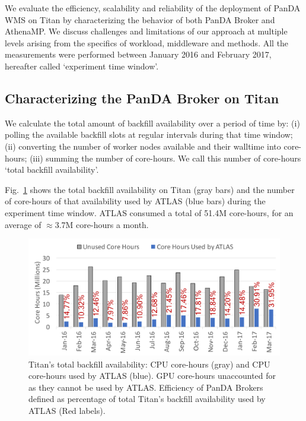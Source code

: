 We evaluate the efficiency, scalability and reliability of the deployment of
PanDA WMS on Titan by characterizing the behavior of both PanDA Broker and
AthenaMP\@. We discuss challenges and limitations of our approach at multiple
levels arising from the specifics of workload, middleware and methods. All
the measurements were performed between January 2016 and February 2017,
hereafter called `experiment time window'.

\subsection{Characterizing the PanDA Broker on Titan}
\label{ssec:broker_titan}

We calculate the total amount of backfill availability over a period of time
by: (i) polling the available backfill slots at regular intervals during that
time window; (ii) converting the number of worker nodes available and their
walltime into core-hours; (iii) summing the number of core-hours. We call
this number of core-hours `total backfill availability'.

Fig.~\ref{fig:backfill-utilization} shows the total backfill availability on
Titan (gray bars) and the number of core-hours of that availability used by
ATLAS (blue bars) during the experiment time window. ATLAS consumed a total
of 51.4M core-hours, for an average of $\approx$3.7M core-hours a month. 

\begin{figure}[!t]
    \includegraphics[clip,width=\columnwidth]{figures/backfill_consumption.pdf}
    \vspace{-0.3in}
    \caption{Titan's total backfill availability: CPU core-hours (gray) and
    CPU core-hours used by ATLAS (blue). GPU core-hours unaccounted for as
    they cannot be used by ATLAS\@. Efficiency of PanDA Brokers defined as
    percentage of total Titan's backfill availability used by ATLAS (Red
    labels).}
\label{fig:backfill-utilization}
\end{figure}

